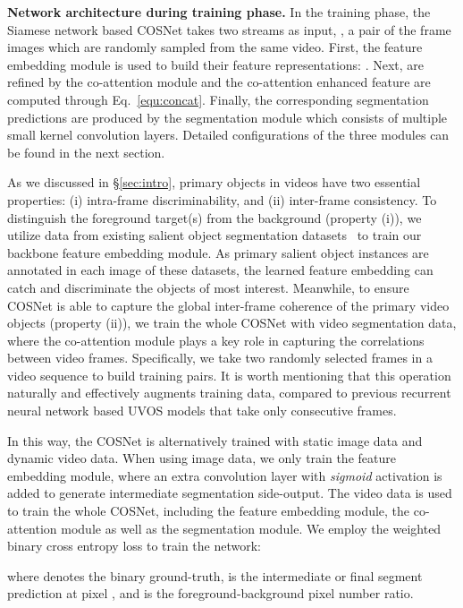 \documentclass[10pt,twocolumn,letterpaper]{article}
\begin{document}
\noindent\textbf{Network architecture during training phase.} In the training phase, the Siamese network based COSNet takes two streams as input, \ie, a pair of the frame images  which are randomly sampled from the same video. First, the feature embedding module is used to build their feature representations: \!. Next,  are refined by the co-attention module and the co-attention enhanced feature  are computed through Eq.~\ref{equ:concat}. Finally, the corresponding segmentation predictions  are produced by the segmentation module which consists of multiple small kernel convolution layers.  Detailed configurations of the three modules can be found in the next section.


As we discussed in \S\ref{sec:intro}, primary objects in videos have two essential properties: (i) intra-frame discriminability, and (ii) inter-frame consistency. To distinguish the  foreground target(s) from the background (property (i)), we utilize data from existing salient object segmentation datasets~\cite{cheng2015global,DBLP:conf/cvpr/YangZLRY13} to train our backbone feature embedding module. As primary salient object instances are annotated in each image of these datasets, the learned feature embedding can catch and discriminate the objects of most interest. Meanwhile, to ensure COSNet is able to capture the global inter-frame coherence of the primary video objects (property (ii)), we train the whole COSNet with video segmentation data, where the co-attention module plays a key role in capturing the correlations between video frames. Specifically, we take two randomly selected frames in a video sequence to build training pairs. It is worth mentioning that this operation naturally and effectively augments training data, compared to previous recurrent neural network based UVOS models that take only consecutive frames.

In this way, the COSNet is alternatively trained with static image data and dynamic video data. When using image data, we only train the feature embedding module, where an extra  convolution layer with \textit{sigmoid} activation is added to generate intermediate segmentation side-output. The video data is used to train the whole COSNet, including the feature embedding module, the co-attention module as well as the segmentation module. We employ the weighted binary cross entropy loss to train the network:

where  denotes the binary ground-truth,  is the intermediate or final segment prediction  at pixel , and
 is the foreground-background pixel number ratio. 
\end{document}
